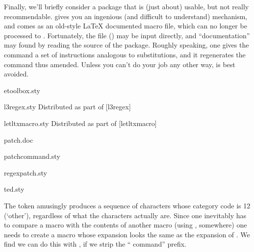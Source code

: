 Finally, we'll briefly consider a package that is (just about)
usable, but not really recommendable.   gives you an
ingenious (and difficult to understand) mechanism, and comes as an
old-style \LaTeX{} documented macro file, which can no longer be
processed to .
Fortunately, the file () may be input directly, and
``documentation'' may found by reading the source of the package.
Roughly speaking, one gives the command a set of instructions
analogous to  substitutions, and it regenerates the
command thus amended.  Unless you can't do your job any other way,
 is best avoided.
\begin{ctanrefs}
\item[etoolbox.sty]
\item[l3regex.sty]Distributed as part of [l3regex]
\item[letltxmacro.sty]Distributed as part of [letltxmacro]
\item[patch.doc]
\item[patchcommand.sty]
\item[regexpatch.sty]
\item[ted.sty]
\end{ctanrefs}


The token  amusingly produces a sequence of characters
whose category code is 12 (`other'), regardless of what the characters
actually are.  Since one inevitably has to compare a macro with the
contents of another macro (using , somewhere) one needs to
create a macro whose expansion looks the same as the expansion of
.  We find we can do this with , if we strip
the `` command'' prefix.

